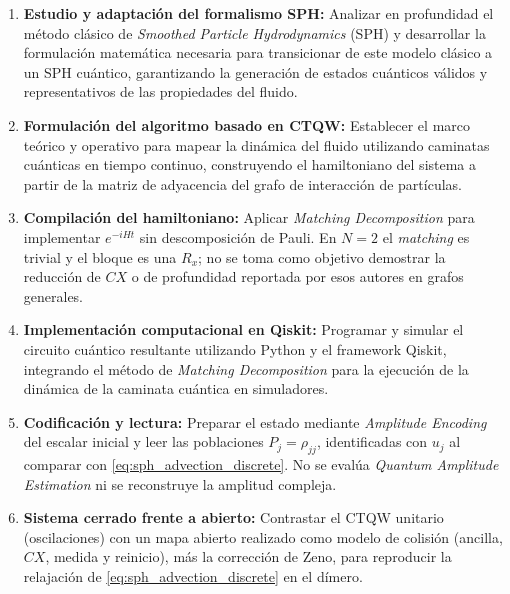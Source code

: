 \begin{enumerate}
    \item \textbf{Estudio y adaptación del formalismo SPH:} Analizar en profundidad el método clásico de \emph{Smoothed Particle Hydrodynamics} (SPH) y desarrollar la formulación matemática necesaria para transicionar de este modelo clásico a un SPH cuántico, garantizando la generación de estados cuánticos válidos y representativos de las propiedades del fluido.
    
    \item \textbf{Formulación del algoritmo basado en CTQW:} Establecer el marco teórico y operativo para mapear la dinámica del fluido utilizando caminatas cuánticas en tiempo continuo, construyendo el hamiltoniano del sistema a partir de la matriz de adyacencia del grafo de interacción de partículas.
    
    \item \textbf{Compilación del hamiltoniano:} Aplicar \emph{Matching Decomposition} \cite{matching2026} para implementar $e^{-iHt}$ sin descomposición de Pauli. En $N=2$ el \emph{matching} es trivial y el bloque es una $R_x$; no se toma como objetivo demostrar la reducción de $CX$ o de profundidad reportada por esos autores en grafos generales.
    
    \item \textbf{Implementación computacional en Qiskit:} Programar y simular el circuito cuántico resultante utilizando Python y el framework Qiskit, integrando el método de \emph{Matching Decomposition} para la ejecución de la dinámica de la caminata cuántica en simuladores.
    
    \item \textbf{Codificación y lectura:} Preparar el estado mediante \emph{Amplitude Encoding} del escalar inicial y leer las poblaciones $P_j = \rho_{jj}$, identificadas con $u_j$ al comparar con \eqref{eq:sph_advection_discrete}. No se evalúa \emph{Quantum Amplitude Estimation} ni se reconstruye la amplitud compleja.
    
    \item \textbf{Sistema cerrado frente a abierto:} Contrastar el CTQW unitario (oscilaciones) con un mapa abierto realizado como modelo de colisión (ancilla, $CX$, medida y reinicio), más la corrección de Zeno, para reproducir la relajación de \eqref{eq:sph_advection_discrete} en el dímero.
\end{enumerate}
